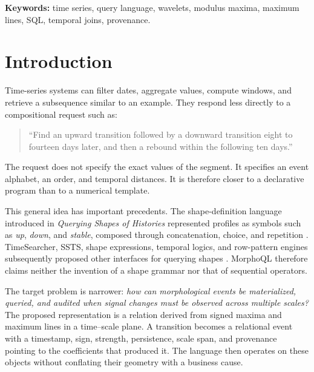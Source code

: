 \documentclass[11pt,a4paper]{article}
\begin{document}
\noindent\textbf{Keywords:} time series, query language, wavelets, modulus maxima, maximum lines, SQL, temporal joins, provenance.

\tableofcontents
\clearpage

\section{Introduction}

Time-series systems can filter dates, aggregate values, compute windows, and retrieve a subsequence similar to an example. They respond less directly to a compositional request such as:
\begin{quote}
``Find an upward transition followed by a downward transition eight to fourteen days later, and then a rebound within the following ten days.''
\end{quote}
The request does not specify the exact values of the segment. It specifies an event alphabet, an order, and temporal distances. It is therefore closer to a declarative program than to a numerical template.

This general idea has important precedents. The shape-definition language introduced in \emph{Querying Shapes of Histories} represented profiles as symbols such as \emph{up}, \emph{down}, and \emph{stable}, composed through concatenation, choice, and repetition \cite{agrawal1995}. TimeSearcher, SSTS, shape expressions, temporal logics, and row-pattern engines subsequently proposed other interfaces for querying shapes \cite{hochheiser2004,rodrigues2019,nickovic2021,maler2004,donze2010,huang2023}. MorphoQL therefore claims neither the invention of a shape grammar nor that of sequential operators.

The target problem is narrower: \emph{how can morphological events be materialized, queried, and audited when signal changes must be observed across multiple scales?} The proposed representation is a relation derived from signed maxima and maximum lines in a time--scale plane. A transition becomes a relational event with a timestamp, sign, strength, persistence, scale span, and provenance pointing to the coefficients that produced it. The language then operates on these objects without conflating their geometry with a business cause.
\end{document}
